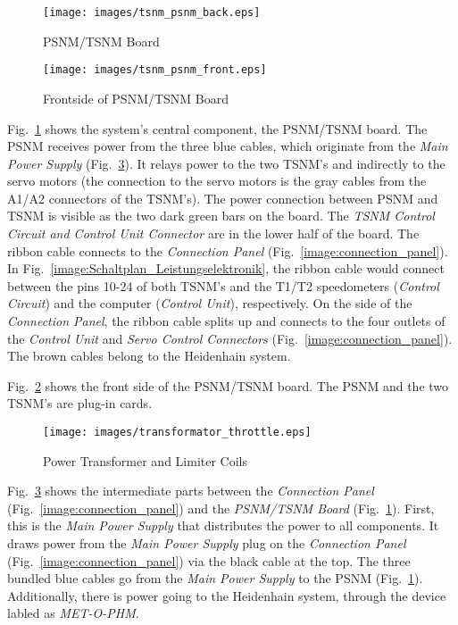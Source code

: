 \begin{figure}[htbp]
    \centering
\texttt{[image: images/tsnm\_psnm\_back.eps]}
    \caption{PSNM/TSNM Board}
  \label{image:tsnm_psnm_back}
\end{figure}

\begin{figure}[htbp]
    \centering
\texttt{[image: images/tsnm\_psnm\_front.eps]}
    \caption{Frontside of PSNM/TSNM Board}
  \label{image:tsnm_psnm_front}
\end{figure}

Fig.~\ref{image:tsnm_psnm_back} shows the system's central component, the
PSNM/TSNM board. The PSNM receives power from the three blue cables, which
originate from the \emph{Main Power Supply}
(Fig.~\ref{image:transformator_throttle}). It relays power to the two TSNM's and
indirectly to the servo motors (the connection to the servo motors is the gray
cables from the A1/A2 connectors of the TSNM's). The power connection between
PSNM and TSNM is visible as the two dark green bars on the board. The \emph{TSNM
Control Circuit and Control Unit Connector} are in the lower
half of the board. The ribbon cable connects to the \emph{Connection Panel}
(Fig.~\ref{image:connection_panel}). In
Fig.~\ref{image:Schaltplan_Leistungselektronik}, the ribbon cable would connect
between the pins 10-24 of both TSNM's and the T1/T2 speedometers (\emph{Control
Circuit}) and the computer (\emph{Control Unit}), respectively. On the side of
the \emph{Connection Panel}, the ribbon cable splits up and connects to the four
outlets of the \emph{Control Unit} and \emph{Servo Control Connectors}
(Fig.~\ref{image:connection_panel}). The brown cables belong to the Heidenhain
system.

Fig.~\ref{image:tsnm_psnm_front} shows the front side of the PSNM/TSNM board.
The PSNM and the two TSNM's are plug-in cards.

\begin{figure}[htbp]
    \centering
\texttt{[image: images/transformator\_throttle.eps]}
    \caption{Power Transformer and Limiter Coils}
  \label{image:transformator_throttle}
\end{figure}

Fig.~\ref{image:transformator_throttle} shows the intermediate parts between
the \emph{Connection Panel} (Fig.~\ref{image:connection_panel}) and the
\emph{PSNM/TSNM Board} (Fig.~\ref{image:tsnm_psnm_back}). First, this is the
\emph{Main Power Supply} that distributes the power to all components. It draws
power from the \emph{Main Power Supply} plug on the \emph{Connection Panel}
(Fig.~\ref{image:connection_panel}) via the black cable at the top. The three
bundled blue cables go from the \emph{Main Power Supply} to the PSNM
(Fig.~\ref{image:tsnm_psnm_back}). Additionally, there is power going to the
Heidenhain system, through the device labled as \emph{MET-O-PHM}.

